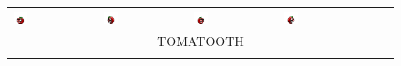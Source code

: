 \documentclass[book.tex]{subfiles}
\begin{document}
\begin{figure}[H]
\begin{table}[H]
\begin{tabularx}{\textwidth}[c]{|XXXXXX|}
  \includegraphics[width=0.18\textwidth]{screenshots_300dpi/game/sprite3a.png} &
  \includegraphics[width=0.18\textwidth]{screenshots_300dpi/game/sprite3b.png} &  
  \includegraphics[width=0.18\textwidth]{screenshots_300dpi/game/sprite3c.png} &
  \includegraphics[width=0.18\textwidth]{screenshots_300dpi/game/sprite3d.png} & & \\  
  \multicolumn{6}{|c|}{TOMATOOTH}  \\ \hline
  \multicolumn{6}{c}{}  \\ \hline      
  

\end{tabularx}
\end{table}
\end{figure}
\end{document}
